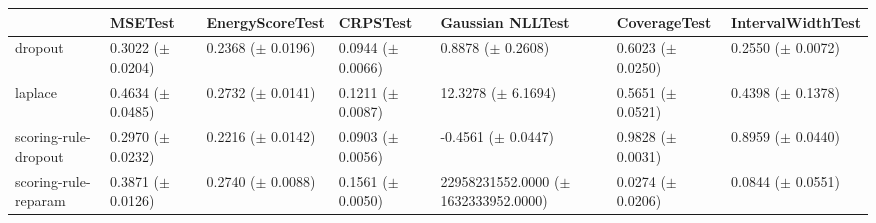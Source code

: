 \begin{tabular}{lllllll}
\toprule
 & MSETest & EnergyScoreTest & CRPSTest & Gaussian NLLTest & CoverageTest & IntervalWidthTest \\
\midrule
dropout & \makecell{0.3022 \\ ($\pm$ 0.0204)} & \makecell{0.2368 \\ ($\pm$ 0.0196)} & \makecell{0.0944 \\ ($\pm$ 0.0066)} & \makecell{0.8878 \\ ($\pm$ 0.2608)} & \makecell{0.6023 \\ ($\pm$ 0.0250)} & \makecell{0.2550 \\ ($\pm$ 0.0072)} \\
laplace & \makecell{0.4634 \\ ($\pm$ 0.0485)} & \makecell{0.2732 \\ ($\pm$ 0.0141)} & \makecell{0.1211 \\ ($\pm$ 0.0087)} & \makecell{12.3278 \\ ($\pm$ 6.1694)} & \makecell{0.5651 \\ ($\pm$ 0.0521)} & \makecell{0.4398 \\ ($\pm$ 0.1378)} \\
scoring-rule-dropout & \makecell{0.2970 \\ ($\pm$ 0.0232)} & \makecell{0.2216 \\ ($\pm$ 0.0142)} & \makecell{0.0903 \\ ($\pm$ 0.0056)} & \makecell{-0.4561 \\ ($\pm$ 0.0447)} & \makecell{0.9828 \\ ($\pm$ 0.0031)} & \makecell{0.8959 \\ ($\pm$ 0.0440)} \\
scoring-rule-reparam & \makecell{0.3871 \\ ($\pm$ 0.0126)} & \makecell{0.2740 \\ ($\pm$ 0.0088)} & \makecell{0.1561 \\ ($\pm$ 0.0050)} & \makecell{22958231552.0000 \\ ($\pm$ 1632333952.0000)} & \makecell{0.0274 \\ ($\pm$ 0.0206)} & \makecell{0.0844 \\ ($\pm$ 0.0551)} \\
\bottomrule
\end{tabular}
